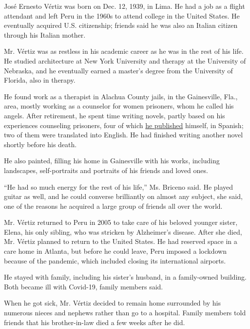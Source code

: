 José Ernesto Vértiz was born on Dec. 12, 1939, in Lima. He had a job as
a flight attendant and left Peru in the 1960s to attend college in the
United States. He eventually acquired U.S. citizenship; friends said he
was also an Italian citizen through his Italian mother.

Mr. Vértiz was as restless in his academic career as he was in the rest
of his life. He studied architecture at New York University and therapy
at the University of Nebraska, and he eventually earned a master's
degree from the University of Florida, also in therapy.

He found work as a therapist in Alachua County jails, in the
Gainesville, Fla., area, mostly working as a counselor for women
prisoners, whom he called his angels. After retirement, he spent time
writing novels, partly based on his experiences counseling prisoners,
four of which
\href{https://www.amazon.com/-/es/Tito-Vertiz/dp/1506509355}{he
published} himself, in Spanish; two of them were translated into
English. He had finished writing another novel shortly before his death.

He also painted, filling his home in Gainesville with his works,
including landscapes, self-portraits and portraits of his friends and
loved ones.

``He had so much energy for the rest of his life,'' Ms. Briceno said. He
played guitar as well, and he could converse brilliantly on almost any
subject, she said, one of the reasons he acquired a large group of
friends all over the world.

Mr. Vértiz returned to Peru in 2005 to take care of his beloved younger
sister, Elena, his only sibling, who was stricken by Alzheimer's
disease. After she died, Mr. Vértiz planned to return to the United
States. He had reserved space in a care home in Atlanta, but before he
could leave, Peru imposed a lockdown because of the pandemic, which
included closing its international airports.

He stayed with family, including his sister's husband, in a family-owned
building. Both became ill with Covid-19, family members said.

When he got sick, Mr. Vértiz decided to remain home surrounded by his
numerous nieces and nephews rather than go to a hospital. Family members
told friends that his brother-in-law died a few weeks after he did.

\href{https://www.nytimes.com/interactive/2020/obituaries/people-died-coronavirus-obituaries.html?action=click\&pgtype=Article\&state=default\&region=BELOW_MAIN_CONTENT\&context=covid_obits_promo}{}

